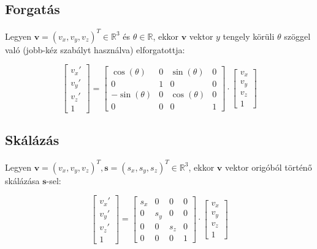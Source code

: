 \subsection{Forgatás}

Legyen $\mathbf{v}=(v_x, v_y, v_z)^T\in\mathbb{R}^3$ és $\theta\in\mathbb{R}$, ekkor $\mathbf{v}$ vektor $y$ tengely körüli $\theta$ szöggel való (jobb-kéz szabályt használva) elforgatottja:

\[\left[\begin{array}{c}v_x' \\v_y' \\v_z' \\ 1 \end{array}\right] = \left[\begin{array}{cccc}
\cos (\theta) & 0 & \sin (\theta) & 0\\
0 & 1 & 0 & 0\\
-\sin(\theta) & 0 & \cos(\theta) & 0\\
0 & 0 & 0 & 1\end{array}\right] \cdot \left[\begin{array}{c}v_x\\ v_y\\ v_z\\ 1\end{array}\right]\]

\subsection{Skálázás}

Legyen $\mathbf{v}=(v_x, v_y, v_z)^T, \mathbf{s}=(s_x, s_y, s_z)^T\in\mathbb{R}^3$, ekkor $\mathbf{v}$ vektor origóból történő skálázása $\mathbf{s}$-sel:

\[\left[\begin{array}{c}v_x' \\v_y' \\v_z' \\ 1 \end{array}\right] = \left[\begin{array}{cccc}s_x & 0 & 0 & 0\\0 & s_y & 0 & 0\\ 0 & 0 & s_z & 0\\ 0 & 0 & 0 & 1\end{array}\right] \cdot \left[\begin{array}{c}v_x\\ v_y\\ v_z\\ 1\end{array}\right]\]

